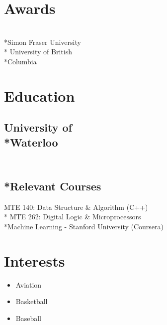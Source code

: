 \documentclass[]{morris-cv}
\begin{document}
\begin{minipage}[t]{0.25\textwidth}
\section{Awards}
\\*Simon Fraser University 
\bigskip
\def\nespace{\hskip\fontdimen2\font\relax}
\\* University of British \\*Columbia

\section{Education}
\subsection*{University of
\\*Waterloo}

\subsection{\\*Relevant Courses}
MTE 140: Data Structure \& Algorithm (C++)
\bigskip
\\* MTE 262:  Digital Logic \& Microprocessors
\bigskip
\\*Machine Learning - Stanford University (Coursera)

\section {Interests}
\begin{itemize}
    \setlength\itemsep{-0.2em}
        \item Aviation
        \item Basketball
        \item Baseball
\end{itemize}
\sectionsep

%
%

\end{minipage} 
\end{document}
